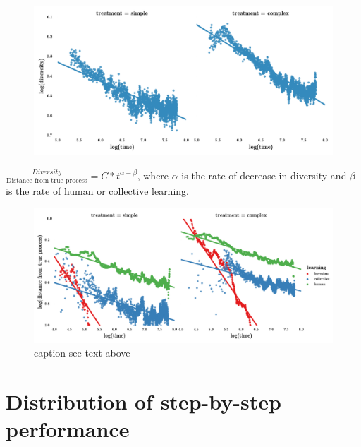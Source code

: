 \documentclass{article}
\begin{document}
  
  
  
  

\begin{figure}[h!]
\begin{center}
\includegraphics[width=1\columnwidth]{figures/DiversityLogLog/DiversityLogLog}
\caption{%
}
\end{center}
\end{figure}

$\frac{Diversity}{\text{Distance from true process}}=C*t^{\alpha - \beta}$, where $\alpha$ is the rate of decrease in diversity and $\beta$ is the rate of human or collective learning. 
  
  

\begin{figure}[h!]
\begin{center}
\includegraphics[width=1\columnwidth]{figures/LogLog/LogLog}
\caption{\label{fig:convergence_humans}
caption see text above%
}
\end{center}
\end{figure}

\section{Distribution of step-by-step performance}
\end{document}
